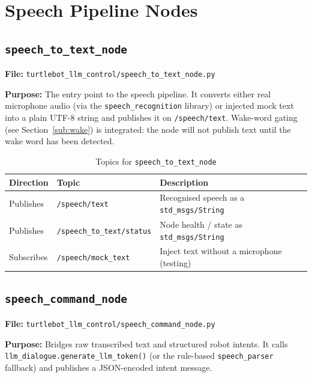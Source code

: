\documentclass[12pt,a4paper]{report}
\newcommand{\topic}[1]{\texttt{\color{purple!80!black}#1}}
\newcommand{\file}[1]{\texttt{\color{black!70}#1}}
\newcommand{\node}[1]{\texttt{\color{Maroon}#1}}
\begin{document}
\section{Speech Pipeline Nodes}

\subsection{\node{speech\_to\_text\_node}}
\label{sub:stt}

\textbf{File:} \file{turtlebot\_llm\_control/speech\_to\_text\_node.py}

\textbf{Purpose:} The entry point to the speech pipeline.  It converts either
real microphone audio (via the \texttt{speech\_recognition} library) or
injected mock text into a plain UTF-8 string and publishes it on
\topic{/speech/text}.  Wake-word gating (see Section~\ref{sub:wake}) is
integrated: the node will not publish text until the wake word has been
detected.

\begin{table}[H]
  \centering
  \caption{Topics for \texttt{speech\_to\_text\_node}}
  \begin{tabularx}{\linewidth}{L{3cm} L{4.5cm} X}
    \toprule
    \textbf{Direction} & \textbf{Topic} & \textbf{Description} \\
    \midrule
    Publishes   & \topic{/speech/text}              & Recognised speech as a \texttt{std\_msgs/String} \\
    Publishes   & \topic{/speech\_to\_text/status}  & Node health / state as \texttt{std\_msgs/String} \\
    Subscribes  & \topic{/speech/mock\_text}        & Inject text without a microphone (testing) \\
    \bottomrule
  \end{tabularx}
\end{table}

\subsection{\node{speech\_command\_node}}
\label{sub:scn}

\textbf{File:} \file{turtlebot\_llm\_control/speech\_command\_node.py}

\textbf{Purpose:} Bridges raw transcribed text and structured robot intents.
It calls \texttt{llm\_dialogue.generate\_llm\_token()} (or the rule-based
\texttt{speech\_parser} fallback) and publishes a JSON-encoded intent message.
\end{document}
